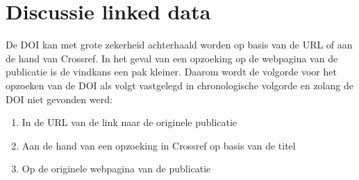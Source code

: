 \section{Discussie linked data}
De DOI kan met grote zekerheid achterhaald worden op basis van de URL of aan de hand van Crossref. In het geval van een opzoeking op de webpagina van de publicatie is de vindkans een pak kleiner. Daarom wordt de volgorde voor het opzoeken van de DOI als volgt vastgelegd in chronologische volgorde en zolang de DOI niet gevonden werd:
\begin{enumerate}
    \item In de URL van de link naar de originele publicatie
    \item Aan de hand van een opzoeking in Crossref op basis van de titel
    \item Op de originele webpagina van de publicatie
\end{enumerate}


